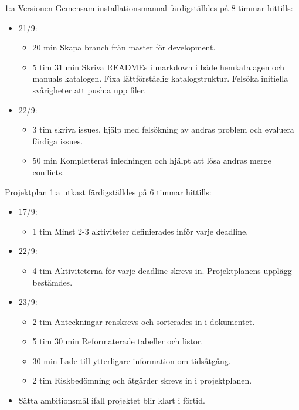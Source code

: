 \documentclass{TDP003mall}
\begin{document}
1:a Versionen Gemensam installationsmanual färdigställdes på 8 timmar hittills:
\begin{itemize}
	\item 21/9:
	\begin{itemize}
		\item 20 min Skapa branch från master för development.
		\item 5 tim 31 min Skriva READMEs i markdown i både hemkatalagen och manuals katalogen. Fixa lättförståelig katalogstruktur. Felsöka initiella svårigheter att push:a upp filer.
	\end{itemize}
	\item 22/9:
	\begin{itemize}
        \item 3 tim skriva issues, hjälp med felsökning av andras problem och evaluera färdiga issues.
          \item 50 min Kompletterat inledningen och hjälpt att lösa andras merge conflicts.\\
	\end{itemize}
\end{itemize}

	Projektplan 1:a utkast färdigställdes på 6 timmar hittills:
\begin{itemize}
	\item 17/9:
	\begin{itemize}
		\item 1 tim Minst 2-3 aktiviteter definierades inför varje deadline.
	\end{itemize}
	\item 22/9:
	\begin{itemize}
		\item 4 tim Aktiviteterna för varje deadline skrevs in. Projektplanens upplägg bestämdes.
	\end{itemize}
	\item 23/9:
	\begin{itemize}
		\item 2 tim Anteckningar renskrevs och sorterades in i dokumentet.
		\item 5 tim 30 min Reformaterade tabeller och listor.
		\item 30 min Lade till ytterligare information om tidsåtgång.
                \item 2 tim Riskbedömning och åtgärder skrevs in i projektplanen.
	\end{itemize}
	\item Sätta ambitionsmål ifall projektet blir klart i förtid.
	
\end{itemize}
\end{document}
